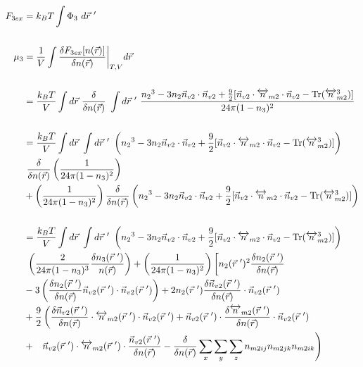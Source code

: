\documentclass[double,12pt]{revtex4-2}
\begin{document}
\begin{align}
  F_{3ex} &= k_BT\int \Phi_3 ~d\vec r~'  \\ 
  \nonumber\\ 
  \mu_3 &= \frac{1}{V}\int \frac{\delta F_{3ex}[n(\vec r)]}{\delta n(\vec r)}
  \bigg|_{T,V} d\vec r \\ \nonumber \\
%
   &= \frac{k_BT}{V}\int d\vec r~\frac{\delta}{\delta n(\vec r)}~\int 
   d\vec r~'~\frac{{n_2}^3-3n_2\vec{n}_{v2}\cdot\vec{n}_{v2}+\frac{9}{2}
    [\vec{n}_{v2}\cdot{\overleftrightarrow{n}_{m2}}\cdot{\vec{n}_{v2}}
    -\operatorname{Tr}({\overleftrightarrow{n}^3_{m2}})]}{24\pi(1-n_3)^2}
     \nonumber \\ \\
%
     &=\frac{k_BT}{V}\int d\vec r~\int d\vec r~'~ \left( {n_2}^3-3n_2
     \vec{n}_{v2}\cdot\vec{n}_{v2} 
     +\frac{9}{2}[\vec{n}_{v2}\cdot{\overleftrightarrow{n}_{m2}}\cdot{
     \vec{n}_{v2}}-\operatorname{Tr}({\overleftrightarrow{n}^3_{m2}})]
     \right) \nonumber\\
      &~ \frac{\delta}{\delta n(\vec r)}\left(\frac{1}{24\pi(1-n_3)^2}
      \right) \nonumber\\
     &+ \left(\frac{1}{24\pi(1-n_3)^2}\right)\frac{\delta}
     {\delta n(\vec r)}\left({n_2}^3-3n_2\vec{n}_{v2}\cdot\vec{n}_{v2}
     +\frac{9}{2}[\vec{n}_{v2}\cdot{\overleftrightarrow{n}_{m2}}\cdot{
     \vec{n}_{v2}}-\operatorname{Tr}({\overleftrightarrow{n}^3_{m2}})]
     \right) \\ \nonumber \\
%
    &=\frac{k_BT}{V}\int d\vec r~\int d\vec r~'~\left( {n_2}^3-3n_2
    \vec{n}_{v2}\cdot\vec{n}_{v2} 
     +\frac{9}{2}[\vec{n}_{v2}\cdot{\overleftrightarrow{n}_{m2}}\cdot{
     \vec{n}_{v2}}-\operatorname{Tr}({\overleftrightarrow{n}^3_{m2}})]
     \right) \nonumber\\
     &~\left(\frac{2}{24\pi(1-n_3)^3}\frac{\delta n_3(\vec r~')}{n(\vec r)}
     \right) 
     + \left(\frac{1}{24\pi(1-n_3)^2}\right)\left[n_2(\vec r~')^2
     \frac{\delta n_2(\vec r~')}{\delta n(\vec r)} \color{white}\right]
      \nonumber\\
     &- 3\left(\frac{\delta n_{2}(\vec r~')}{\delta n(\vec r)}\vec n_{v2}
     (\vec r~') \cdot \vec n_{v2}(\vec r~')\right) + 2n_2(\vec r~')\frac{\delta
     \vec n_{v2}(\vec r~')}{\delta n(\vec r)}\cdot \vec n_{v2}(\vec r~') 
     \nonumber\\
     &+\frac{9}{2}\left(\frac{\delta \vec n_{v2}(\vec r~')}{\delta n(\vec r)}
     \cdot \overleftrightarrow n_{m2}(\vec r~')\cdot \vec n_{v2}( \vec r~')
     +\vec n_{v2}(\vec r~')\cdot \frac{\delta \overleftrightarrow n_{m2}
     (\vec r~')}{\delta n(\vec r)}\cdot \vec n_{v2}(\vec r~')\color{white}
     \right)\nonumber\\
     &+ \color{white}\left(\color{black}\vec n_{v2}(\vec r~')\cdot 
     \overleftrightarrow n_{m2}(\vec r~')
     \cdot \frac{\vec n_{v2}(\vec r~')}{\delta n(\vec r)}-
     \frac{\delta}{\delta n(\vec r)}\sum_x\sum_y\sum_z n_{m2ij}n_{m2jk}
     n_{m2ik}\right) 
\end{align} 
\end{document}
